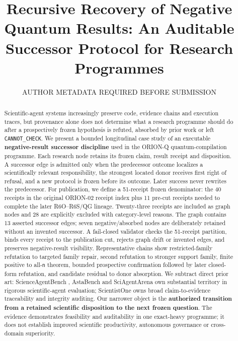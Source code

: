 \documentclass[preprint,12pt]{elsarticle}
\begin{document}
\begin{frontmatter}
\title{Recursive Recovery of Negative Quantum Results: An Auditable
Successor Protocol for Research Programmes}
\author{AUTHOR METADATA REQUIRED BEFORE SUBMISSION}
\address{AUTHOR AFFILIATION REQUIRED BEFORE SUBMISSION}
\begin{abstract}
Scientific-agent systems increasingly preserve code, evidence chains and
execution traces, but provenance alone does not determine what a
research programme should do after a prospectively frozen hypothesis is
refuted, absorbed by prior work or left \texttt{CANNOT\_CHECK}. We
present a bounded longitudinal case study of an executable
\textbf{negative-result successor discipline} used in the ORION-Q
quantum-compilation programme. Each research node retains its frozen
claim, result receipt and disposition. A successor edge is admitted only
when the predecessor outcome localizes a scientifically relevant
responsibility, the strongest located donor receives first right of
refusal, and a new protocol is frozen before its outcome. Later success
never rewrites the predecessor. For publication, we define a 51-receipt
frozen denominator: the 40 receipts in the original ORION-02 receipt
index plus 11 pre-cut receipts needed to complete the later R6O--R6S/QG
lineage. Twenty-three receipts are included as graph nodes and 28 are
explicitly excluded with category-level reasons. The graph contains 13
asserted successor edges; seven negative/absorbed nodes are deliberately
retained without an invented successor. A fail-closed validator checks
the 51-receipt partition, binds every receipt to the publication cut,
rejects graph drift or invented edges, and preserves negative-result
visibility. Representative chains show restricted-family refutation to
targeted family repair, second refutation to stronger support family,
finite positive to all-\texttt{n} theorem, bounded prospective
confirmation followed by later closed-form refutation, and candidate
residual to donor absorption. We subtract direct prior art:
ScienceAgentBench \citep{chen2025scienceagentbench}, AstaBench
\citep{bragg2025astabench} and SciAgentArena
\citep{liu2026sciagentarena} own substantial territory in rigorous
scientific-agent evaluation; ScientistOne \citep{meng2026scientistone}
owns broad claim-to-evidence traceability and integrity auditing. Our
narrower object is the \textbf{authorized transition from a retained
scientific disposition to the next frozen question}. The evidence
demonstrates feasibility and auditability in one exact-heavy programme;
it does not establish improved scientific productivity, autonomous
governance or cross-domain superiority.
\end{abstract}
\end{frontmatter}
\end{document}
